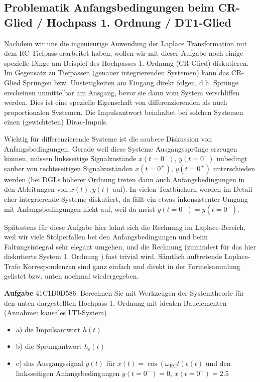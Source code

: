 \subsection{Problematik Anfangsbedingungen beim CR-Glied / Hochpass 1. Ordnung / DT1-Glied}
\label{sec:41C1D0D586}
\begin{Ziel}
Nachdem wir uns die ingenieurige Anwendung der Laplace Transformation mit dem
RC-Tiefpass erarbeitet haben, wollen wir mit dieser Aufgabe noch einige
spezielle Dinge am Beispiel des Hochpasses 1. Ordnung (CR-Glied)
diskutieren.
%
Im Gegensatz zu Tiefpässen (genauer integrierenden Systemen) kann das CR-Glied
Sprüngen bzw. Unstetigkeiten am Eingang direkt folgen,
d.h. Sprünge erscheinen unmittelbar am Ausgang, bevor sie dann vom
System verschliffen werden.
%
Dies ist eine spezielle Eigenschaft von differenzierenden als auch proportionalen Systemen.
%
Die Impulsantwort beinhaltet bei solchen Systemen einen (gewichteten) Dirac-Impuls.

Wichtig für differenzierende Systeme ist die saubere Diskussion von Anfangsbedingungen.
Gerade weil diese Systeme Ausgangssprünge erzeugen können, müssen
linksseitige Signalzustände $x(t=0^-)$, $y(t=0^-)$ unbedingt sauber von rechtsseitigen
Signalzuständen $x(t=0^+)$, $y(t=0^+)$ unterschieden werden (bei DGLs höherer Ordnung
treten dann auch Anfangsbedingungen in den Ableitungen von $x(t), y(t)$ auf).
In vielen Textbüchern werden im Detail eher integrierende Systeme diskutiert, da fällt
ein etwas inkonsistenter Umgang mit Anfangsbedingungen nicht auf, weil da meist
$y(t=0^-) = y(t=0^+)$.
%

Spätestens für diese Aufgabe hier lohnt sich die Rechnung im Laplace-Bereich,
weil wir viele Stolperfallen
bei den Anfangsbedingungen und beim Faltungsintegral sehr elegant umgehen, und die
Rechnung (zumindest für das hier diskutierte System 1. Ordnung ) fast trivial wird.
Sämtlich auftretende Laplace-Trafo Korrespondenzen sind ganz einfach und direkt
in der Formelsammlung gelistet bzw. unten nochmal wiedergegeben.
\end{Ziel}
\textbf{Aufgabe} {\tiny 41C1D0D586}: Berechnen Sie mit Werkzeugen der Systemtheorie
für den unten dargestellten Hochpass 1. Ordnung
mit idealen Bauelementen (Annahme: kausales LTI-System)
\begin{itemize}
  \item a) die Impulsantwort $h(t)$
  \item b) die Sprungantwort $h_\epsilon(t)$
  \item c) das Ausgangssignal $y(t)$ für $x(t) = \cos(\omega_\mathrm{RC} t) \epsilon(t)$ und den linksseitigen Anfangsbedingungen $y(t=0^-) = 0$, $x(t=0^-) = 2.5$
\end{itemize}
